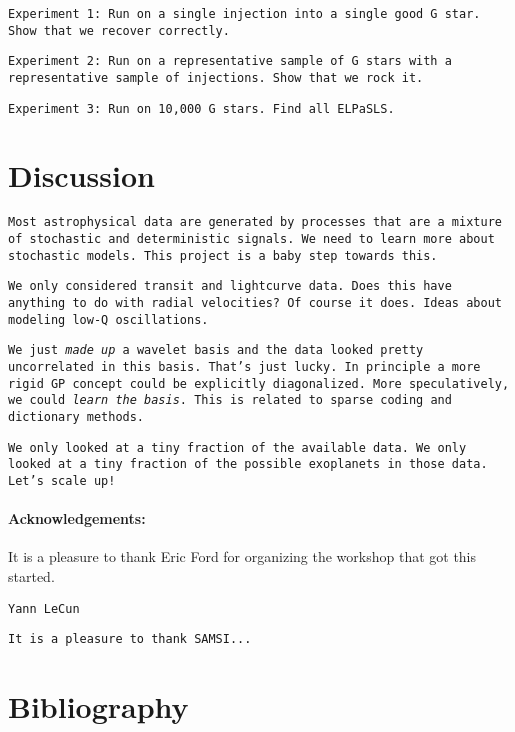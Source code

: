 \documentclass[12pt,letterpaper]{article}
\newcommand{\warning}[1]{\texttt{#1}}
\begin{document}
\warning{Experiment 1: Run on a single injection into a single good G star.
         Show that we recover correctly.}

\warning{Experiment 2: Run on a representative sample of G stars with a representative sample of injections.
         Show that we rock it.}

\warning{Experiment 3: Run on 10,000 G stars.
         Find all ELPaSLS.}

\section{Discussion}

\warning{Most astrophysical data are generated by processes that are a mixture of
         stochastic and deterministic signals.
         We need to learn more about stochastic models.
         This project is a baby step towards this.}

\warning{We only considered transit and lightcurve data.
         Does this have anything to do with radial velocities?
         Of course it does.
         Ideas about modeling low-Q oscillations.}

\warning{We just \emph{made up} a wavelet basis and the data looked pretty uncorrelated in this basis.
         That's just lucky.
         In principle a more rigid GP concept could be explicitly diagonalized.
         More speculatively, we could \emph{learn the basis}.
         This is related to sparse coding and dictionary methods.}

\warning{We only looked at a tiny fraction of the available data.
         We only looked at a tiny fraction of the possible exoplanets in those data.
         Let's scale up!}

\paragraph{Acknowledgements:}
It is a pleasure to thank Eric Ford for organizing the workshop that got this started.

\warning{Yann LeCun}

\warning{It is a pleasure to thank SAMSI...}

\section*{Bibliography}
\end{document}

